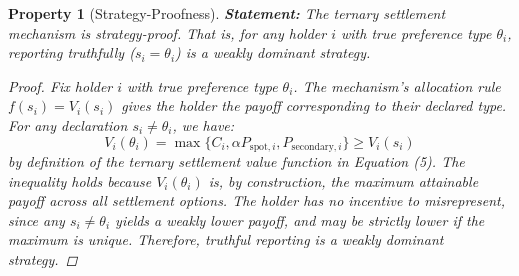 \documentclass[12pt,a4paper]{article}
\newtheorem{property}{Property}
\begin{document}
\begin{property}[Strategy-Proofness]
\label{prop:sp}
\textbf{Statement:} The ternary settlement mechanism is strategy-proof. That is, for any holder $i$ with true preference type $\theta_i$, reporting truthfully ($s_i = \theta_i$) is a weakly dominant strategy.

\begin{proof}
Fix holder $i$ with true preference type $\theta_i$.
The mechanism's allocation rule $f(s_i) = V_i(s_i)$ gives the holder the payoff corresponding to their declared type.
For any declaration $s_i \neq \theta_i$, we have:
\begin{equation}
    V_i(\theta_i) = \max\{C_i, \alpha P_{\text{spot}, i}, P_{\text{secondary}, i}\} \geq V_i(s_i)
\end{equation}
by definition of the ternary settlement value function in Equation (5).
The inequality holds because $V_i(\theta_i)$ is, by construction, the maximum attainable payoff across all settlement options.
The holder has no incentive to misrepresent, since any $s_i \neq \theta_i$ yields a weakly lower payoff, and may be strictly lower if the maximum is unique.
Therefore, truthful reporting is a weakly dominant strategy.
\end{proof}
\end{property}
\end{document}
